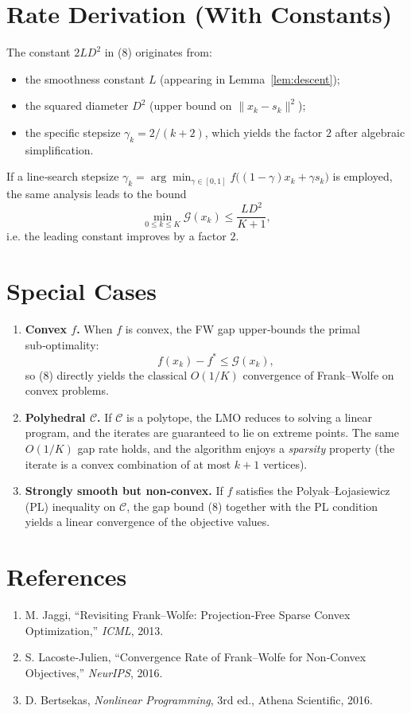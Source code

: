 \documentclass{article}
\newcommand{\gap}{\mathcal{G}}
\begin{document}
\section*{Rate Derivation (With Constants)}
The constant $2L D^{2}$ in (8) originates from:
\begin{itemize}
\item the smoothness constant $L$ (appearing in Lemma~\ref{lem:descent});
\item the squared diameter $D^{2}$ (upper bound on $\|x_{k}-s_{k}\|^{2}$);
\item the specific stepsize $\gamma_{k}=2/(k+2)$, which yields the factor $2$ after algebraic simplification.
\end{itemize}
If a line‑search stepsize $\gamma_{k}=\arg\min_{\gamma\in[0,1]} f\bigl((1-\gamma)x_{k}+\gamma s_{k}\bigr)$ is employed, the same analysis leads to the bound
\[
\min_{0\le k\le K}\gap(x_{k})\le \frac{L D^{2}}{K+1},
\]
i.e. the leading constant improves by a factor $2$.

\section*{Special Cases}
\begin{enumerate}
\item \textbf{Convex $f$.}  When $f$ is convex, the FW gap upper‑bounds the primal sub‑optimality:
\[
f(x_{k})-f^{*}\le \gap(x_{k}),
\]
so (8) directly yields the classical $O(1/K)$ convergence of Frank–Wolfe on convex problems.
\item \textbf{Polyhedral $\mathcal C$.}  If $\mathcal C$ is a polytope, the LMO reduces to solving a linear program, and the iterates are guaranteed to lie on extreme points.  The same $O(1/K)$ gap rate holds, and the algorithm enjoys a \emph{sparsity} property (the iterate is a convex combination of at most $k+1$ vertices).
\item \textbf{Strongly smooth but non‑convex.}  If $f$ satisfies the Polyak–Łojasiewicz (PL) inequality on $\mathcal C$, the gap bound (8) together with the PL condition yields a linear convergence of the objective values.
\end{enumerate}

\section*{References}
\begin{enumerate}
\item M. Jaggi, “Revisiting Frank–Wolfe: Projection‑Free Sparse Convex Optimization,” \emph{ICML}, 2013.
\item S. Lacoste‑Julien, “Convergence Rate of Frank–Wolfe for Non‑Convex Objectives,” \emph{NeurIPS}, 2016.
\item D. Bertsekas, \emph{Nonlinear Programming}, 3rd ed., Athena Scientific, 2016.
\end{enumerate}
\end{document}
